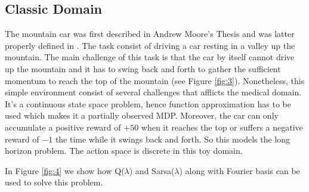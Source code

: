 \subsection{Classic Domain}

The mountain car was first described in Andrew Moore's Thesis \citep{Efficient memory-based learning for robot control} and was latter properly defined in \citet{DBLP:journals/ml/SinghS96}. The task consist of driving a car resting in a valley up the mountain. The main challenge of this task is that the car by itself cannot drive up the mountain and it has to swing back and forth to gather the sufficient momentum to reach the top of the mountain (see Figure \ref{fig:3}). Nonetheless, this simple environment consist of several challenges that afflicts the medical domain. It's a continuous state space problem, hence function approximation has to be used which makes it a partially observed MDP. Moreover, the car can only accumulate a positive reward of $+50$ when it reaches the top or suffers a negative reward of $-1$ the time while it swings back and forth.  So this models the long horizon problem. The action space is discrete in this toy domain. 

In Figure \ref{fig:4} we show how Q($\lambda$) and Sarsa($\lambda$) along with Fourier basis can be used to solve this problem.


